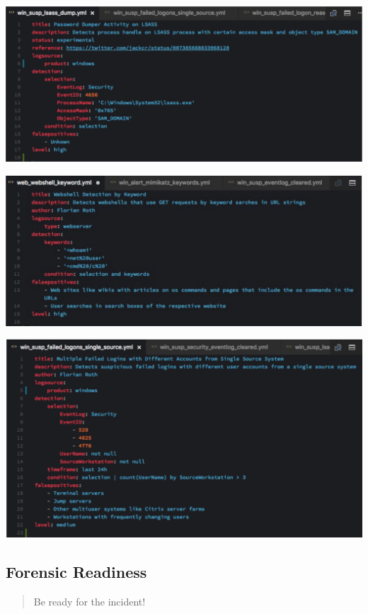 \begin{center}
\includegraphics[width=\textwidth]{resources/12-sigma-detection-2.png}
\end{center}

\begin{center}
\includegraphics[width=\textwidth]{resources/12-sigma-detection-3.png}
\end{center}

\begin{center}
\includegraphics[width=\textwidth]{resources/12-sigma-detection-4.png}
\end{center}

\subsection{Forensic Readiness}
\begin{quotation}
  Be ready for the incident!
\end{quotation}

